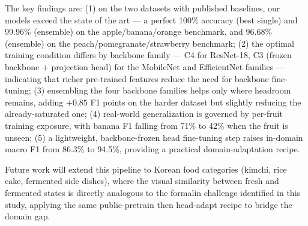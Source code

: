 \documentclass[conference]{IEEEtran}
\begin{document}
The key findings are:
(1) on the two datasets with published baselines, our models exceed the
state of the art --- a perfect 100\% accuracy (best single) and 99.96\%
(ensemble) on the apple/banana/orange benchmark, and 96.68\% (ensemble) on
the peach/pomegranate/strawberry benchmark;
(2) the optimal training condition differs by backbone family --- C4 for
ResNet-18, C3 (frozen backbone + projection head) for the MobileNet and
EfficientNet families --- indicating that richer pre-trained features
reduce the need for backbone fine-tuning;
(3) ensembling the four backbone families helps only where headroom
remains, adding $+0.85$ F1 points on the harder dataset but slightly
reducing the already-saturated one;
(4) real-world generalization is governed by per-fruit training exposure,
with banana F1 falling from 71\% to 42\% when the fruit is unseen;
(5) a lightweight, backbone-frozen head fine-tuning step raises in-domain
macro F1 from 86.3\% to 94.5\%, providing a practical domain-adaptation
recipe.

Future work will extend this pipeline to Korean food categories
(kimchi, rice cake, fermented side dishes), where the visual similarity
between fresh and fermented states is directly analogous to the
formalin challenge identified in this study, applying the same
public-pretrain then head-adapt recipe to bridge the domain gap.



\end{document}
